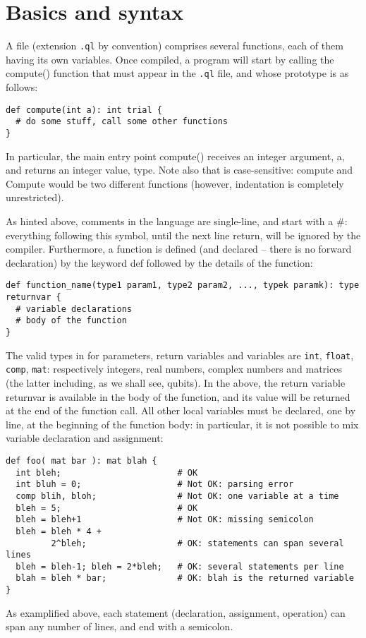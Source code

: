 \section{Basics and syntax}

A \QL file (extension \texttt{.ql} by convention) comprises several functions, each of them having its own variables. Once compiled, a program will start by calling the \textsf{compute()} function that must appear in the \texttt{.ql} file, and whose prototype is as follows:
\begin{lstlisting}
def compute(int a): int trial {
  # do some stuff, call some other functions
}
\end{lstlisting}
In particular, the main entry point \textsf{compute()} receives an integer argument, \textsf{a}, and returns an integer value, \textsf{type}.
Note also that \QL is case-sensitive: \textsf{compute} and \textsf{Compute} would be two different functions (however, indentation is completely unrestricted).

As hinted above, comments in the language are single-line, and start with a \#: everything following this symbol, until the next line return, will be ignored by the compiler. Furthermore, a function is defined (and declared -- there is no forward declaration) by the keyword \textsf{def} followed by the details of the function:
\begin{lstlisting}
def function_name(type1 param1, type2 param2, ..., typek paramk): type returnvar {
  # variable declarations
  # body of the function
}
\end{lstlisting}
The valid types  in \QL for parameters, return variables and variables are \texttt{int}, \texttt{float}, \texttt{comp}, \texttt{mat}: respectively integers, real numbers, complex numbers and matrices (the latter including, as we shall see, qubits). In the above, the return variable \textsf{returnvar} is available in the body of the function, and its value will be returned at the end of the function call. All other local variables must be declared, one by line, at the beginning of the function body: in particular, it is not possible to mix variable declaration and assignment:
\begin{lstlisting}
def foo( mat bar ): mat blah {
  int bleh;                       # OK
  int bluh = 0;                   # Not OK: parsing error
  comp blih, bloh;                # Not OK: one variable at a time
  bleh = 5;                       # OK
  bleh = bleh+1                   # Not OK: missing semicolon
  bleh = bleh * 4 +
         2^bleh;                  # OK: statements can span several lines
  bleh = bleh-1; bleh = 2*bleh;   # OK: several statements per line
  blah = bleh * bar;              # OK: blah is the returned variable
}
\end{lstlisting}
As examplified above, each statement (declaration, assignment, operation) can span any number of lines, and end with a semicolon.

